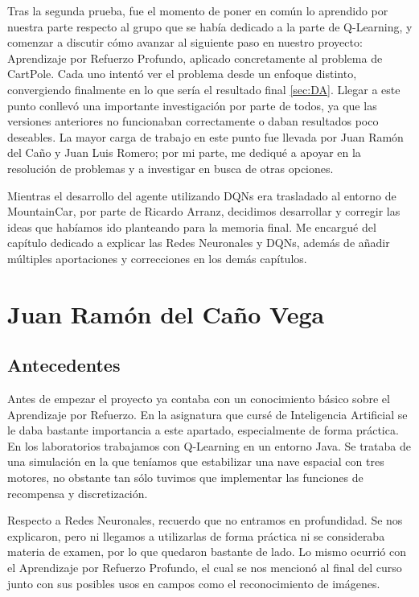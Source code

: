 Tras la segunda prueba, fue el momento de poner en común lo aprendido por nuestra parte respecto al grupo que se había dedicado a la parte de Q-Learning, y comenzar a discutir cómo avanzar al siguiente paso en nuestro proyecto: Aprendizaje por Refuerzo Profundo, aplicado concretamente al problema de CartPole. Cada uno intentó ver el problema desde un enfoque distinto, convergiendo finalmente en lo que sería el resultado final \ref{sec:DA}. Llegar a este punto conllevó una importante investigación por parte de todos, ya que las versiones anteriores no funcionaban correctamente o daban resultados poco deseables. La mayor carga de trabajo en este punto fue llevada por Juan Ramón del Caño y Juan Luis Romero; por mi parte, me dediqué a apoyar en la resolución de problemas y a investigar en busca de otras opciones.

Mientras el desarrollo del agente utilizando DQNs era trasladado al entorno de MountainCar, por parte de Ricardo Arranz, decidimos desarrollar y corregir las ideas que habíamos ido planteando para la memoria final. Me encargué del capítulo dedicado a explicar las Redes Neuronales y DQNs, además de añadir múltiples aportaciones y correcciones en los demás capítulos.


\section{Juan Ramón del Caño Vega}


\subsection{Antecedentes}

Antes de empezar el proyecto ya contaba con un conocimiento básico sobre el Aprendizaje por Refuerzo. En la asignatura que cursé de Inteligencia Artificial se le daba bastante importancia a este apartado, especialmente de forma práctica. En los laboratorios trabajamos con Q-Learning en un entorno Java. Se trataba de una simulación en la que teníamos que estabilizar una nave espacial con tres motores, no obstante tan sólo tuvimos que implementar las funciones de recompensa y discretización.

Respecto a Redes Neuronales, recuerdo que no entramos en profundidad. Se nos explicaron, pero ni llegamos a utilizarlas de forma práctica ni se consideraba materia de examen, por lo que quedaron bastante de lado. Lo mismo ocurrió con el Aprendizaje por Refuerzo Profundo, el cual se nos mencionó al final del curso junto con sus posibles usos en campos como el reconocimiento de imágenes.

